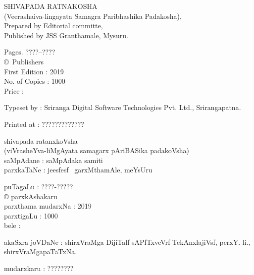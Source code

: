 \thispagestyle{empty}
\noindent
{\rm SHIVAPADA RATNAKOSHA}\\[5pt]
{\rm (Veerashaiva-lingayata Samagra Paribhashika Padakosha),}\\[4pt]
{\rm Prepared by Editorial committe,}\\[4pt]
{\rm Published by JSS Granthamale, Mysuru.}

\vspace{1cm}

\noindent
{\rm Pages. ????--????}\\[7pt]
{\rm \copyright \ Publishers}\\[7pt]
{\rm First Edition : 2019}\\[7pt]
{\rm No. of Copies : 1000}\\[7pt]
{\rm Price :} \rupee

\bigskip

\noindent
{\rm Typeset by : Sriranga Digital Software Technologies Pvt. Ltd., Srirangapatna.}

\medskip

\noindent
{\rm Printed at : ?????????????}

\vfill

\noindent
{\large shivapada ratanxkoVsha}\\[5pt]
(viVrasheYva-liMgAyata samagarx pAriBASika padakoVsha)\\[5pt]
saMpAdane : saMpAdaka samiti\\[4pt]
parxkaTaNe : je{esf}{esf} \ garxMthamAle, meYsUru\\

\vspace{1cm}

\noindent
puTagaLu : ????-?????\\[3pt]
{\rm \copyright} parxkAshakaru\\[7pt]
parxthama mudarxNa : 2019\\[7pt]
parxtigaLu : 1000\\[10pt]
bele : \rupee

\bigskip

\noindent
akaSxra joVDaNe : shirxVraMga DijiTalf sAPfTxveVrf TekAnxlajiVsf, perxY. li., shirxVraMgapaTaTxNa.

\medskip

\noindent
mudarxkaru : ????????

\newpage

\thispagestyle{empty}

\phantom{a}

\vfill

